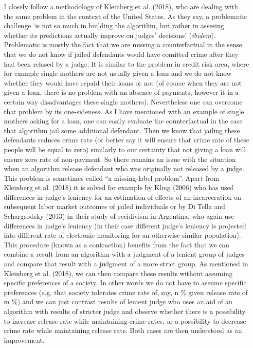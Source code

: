 \documentclass[12pt, twoside]{book} %
\begin{document}
I closely follow a methodology of Kleinberg et al. (2018), who are dealing with the same problem in the context of the United States. As they say, a problematic challenge ‘is not so much in building the algorithm, but rather in assesing whether its predictions actually improve on judges' decisions’ (\textit{ibidem}). Problematic is mostly the fact that we are missing a counterfactual in the sense that we do not know if jailed defendants would have comitted crime after they had been relased by a judge. It is similar to the problem in credit risk area, where for example single mothers are not usually given a loan and we do not know whether they would have repaid their loans or not (of course when they are not given a loan, there is no problem with an absence of payments, however it in a certain way disadvantages these single mothers). Nevertheless one can overcome that problem by its one-sideness. As I have mentioned with an example of single mothers asking for a loan, one can easily evaluate the counterfactual in the case that algorithm jail some additional  defendant. Then we know that jailing these defendants reduces crime rate (or better say it will ensure that crime rate of these people will be equal to zero) similarly to our certainty that not giving a loan will ensure zero rate of non-payment. So there remains an issue with the situation when an algorithm release defendant who was originally not released by a judge. This problem is sometimes called “a missing-label problem”. Apart from Kleinberg et al. (2018) it is solved for example by Kling (2006) who has used differences in judge's leniency for an estimation of effects of an incarceration on subsequent labor market outcomes of jailed individuals or by Di Tella and Schargrodsky (2013) in their study of recidivism in Argentina, who again use differences in judge's leniency (in their case different judge's leniency is projected into different rate of electronic monitoring for an otherwise similar population). This procedure (known as a contraction) benefits from the fact that we can combine a result from an algorithm with a judgment of a lenient group of judges and compare that result with a judgment of a more strict group. As mentioned in Kleinberg et al. (2018), we can then compare these results without assuming specific preferences of a society. In other words we do not have to assume specific preferences (e.g. that society tolerates crime rate of, say, n \% given release rate of m \%) and we can just contrast results of lenient judge who uses an aid of an algorithm with results of stricter judge and observe whether there is a possibility to increase release rate while maintaining crime rates, or a possibility to decrease crime rate while maintaining release rate. Both cases are then understood as an improvement.\newline
\end{document}
